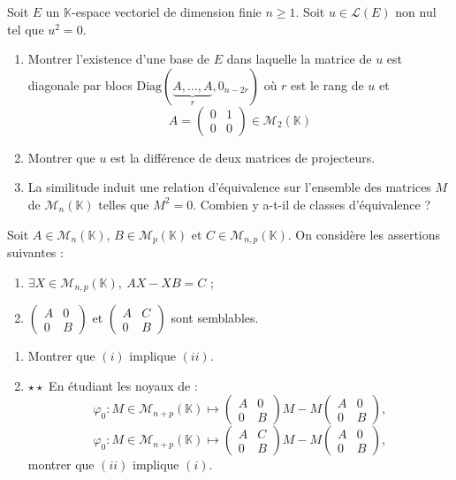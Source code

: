 \documentclass[french,a4paper]{article}
\newcommand{\K}{\mathbb{K}}
\theoremstyle{plain}
\theoremstyle{definition}
\theoremstyle{remark}
\begin{document}
\begin{ex}{}
	Soit $E$ un $\K$-espace vectoriel de dimension finie $n\geqslant 1$. Soit $u\in\mathcal{L}(E)$ non nul tel que $u^2=0$.
	\begin{enumerate}
		\item Montrer l'existence d'une base de $E$ dans laquelle la matrice de $u$ est diagonale par blocs $\text{Diag}(\underbrace{A,\ldots,A}_{r},0_{n-2r})$ où $r$ est le rang de $u$ et $$A=\begin{pmatrix}
			0&1\\
			0&0
		\end{pmatrix}\in\mathcal{M}_2(\K)$$
		\item Montrer que $u$ est la différence de deux matrices de projecteurs.
		\item La similitude induit une relation d'équivalence sur l'ensemble des matrices $M$ de $\mathcal{M}_n(\K)$ telles que $M^2=0$. Combien y a-t-il de classes d'équivalence ?
	\end{enumerate}
\end{ex}

\begin{ex}{}
	Soit $A\in\mathcal{M}_n(\K)$, $B\in\mathcal{M}_p(\K)$ et $C\in\mathcal{M}_{n,p}(\K)$. On considère les assertions suivantes :
	\begin{enumerate}[label=(\roman*)]
		\item $\exists X\in\mathcal{M}_{n,p}(\K),\ AX-XB=C$ ;
		\item $\displaystyle\begin{pmatrix}
			A&0\\
			0&B
		\end{pmatrix}$ et $\displaystyle\begin{pmatrix}
		A&C\\
		0&B
		\end{pmatrix}$ sont semblables.
	\end{enumerate}
	\begin{enumerate}
		\item Montrer que $(i)$ implique $(ii)$.
		\item $\star\star$ En étudiant les noyaux de : $$\varphi_0:M\in\mathcal{M}_{n+p}(\K)\mapsto \begin{pmatrix}
			A&0\\
			0&B
		\end{pmatrix}M-M\begin{pmatrix}
		A&0\\
		0&B
		\end{pmatrix},$$
		$$\varphi_0:M\in\mathcal{M}_{n+p}(\K)\mapsto \begin{pmatrix}
			A&C\\
			0&B
		\end{pmatrix}M-M\begin{pmatrix}
			A&0\\
			0&B
		\end{pmatrix},$$ montrer que $(ii)$ implique $(i)$.
	\end{enumerate}
\end{ex}
\end{document}
